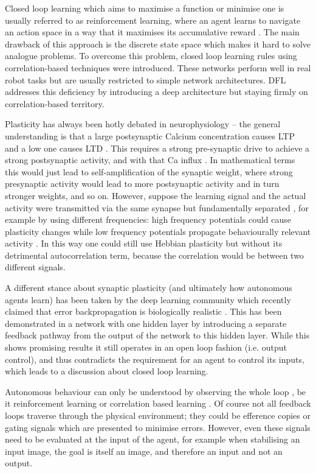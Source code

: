 \documentclass{llncs}
\begin{document}
Closed loop learning which aims to maximise a function or minimise one
is usually referred to as reinforcement learning, where an agent learns to
navigate an action space in a way that it maximises its accumulative
reward \cite{Dayan1992}. The main drawback of this approach
is the discrete state space which makes it hard to solve analogue
problems. To overcome this problem, closed loop learning rules using
correlation-based techniques \cite{Verschure98summary} were introduced.
These networks perform well in real robot tasks but are usually restricted to 
simple network architectures. DFL addresses this
deficiency by introducing a deep architecture but staying firmly
on correlation-based territory.

Plasticity has always been hotly debated in neurophysiology -- the
general understanding is that a large postsynaptic Calcium
concentration causes LTP \cite{Malenka99,Bennett2000} and a low one
causes LTD \cite{Mulkey1992}. This requires a strong pre-synaptic
drive to achieve a strong postsynaptic activity, and with that Ca
influx \cite{Meunier2017}. In mathematical terms this would just lead
to self-amplification of the synaptic weight, where strong presynaptic
activity would lead to more postsynaptic activity and in turn stronger
weights, and so on. However, suppose the learning signal and the
actual activity were transmitted via the same synapse but
fundamentally separated \cite{Lindsay2017}, for example by using
different frequencies: high frequency potentials could cause
plasticity changes while low frequency potentials propagate behaviourally
relevant activity \cite{Canolty2010}. In this way one could still use Hebbian
plasticity but without its detrimental autocorrelation term, because the
correlation would be between two different signals.

A different stance about synaptic plasticity (and ultimately how
autonomous agents learn) has been taken by the deep learning community
which recently claimed that error backpropagation is biologically
realistic \cite{Lillicrap2016,Roelfsema2018}. This has been
demonstrated in a network with one hidden layer by introducing a
separate feedback pathway from the output of the network to this
hidden layer. While this shows promising results it still operates in
an open loop fashion (i.e. output control), and thus contradicts the
requirement for an agent to control its inputs, which leads to a
discussion about closed loop learning.

Autonomous behaviour can only be understood by observing the whole
loop \cite{Porr2005kyb}, be it reinforcement learning \cite{Sutton98}
or correlation based learning \cite{Verschure91}. Of course not all
feedback loops traverse through the physical environment; they could
be efference copies \cite{Uexkuell26,Graesser86} or gating signals
which are presented to minimise errors. However, even these signals
need to be evaluated at the input of the agent, for example when
stabilising an input image, the goal is itself an image, and therefore
an input and not an output.
\end{document}
